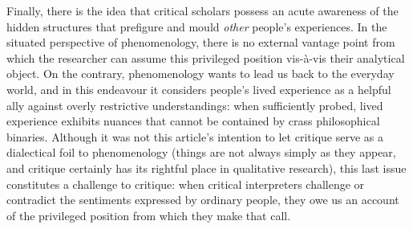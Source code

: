 \begin{adjmulticols}{2}{0mm}{0mm}
Finally, there is the idea that critical scholars possess an acute awareness of the hidden structures that prefigure and mould \textit{other} people’s experiences. In the situated perspective of phenomenology, there is no external vantage point from which the researcher can assume this privileged position vis-à-vis their analytical object. On the contrary, phenomenology wants to lead us back to the everyday world, and in this endeavour it considers people’s lived experience as a helpful ally against overly restrictive understandings: when sufficiently probed, lived experience exhibits nuances that cannot be contained by crass philosophical binaries. Although it was not this article’s intention to let critique serve as a dialectical foil to phenomenology (things are not always simply as they appear, and critique certainly has its rightful place in qualitative research), this last issue constitutes a challenge to critique: when critical interpreters challenge or contradict the sentiments expressed by ordinary people, they owe us an account of the privileged position from which they make that call.
    \end{adjmulticols}